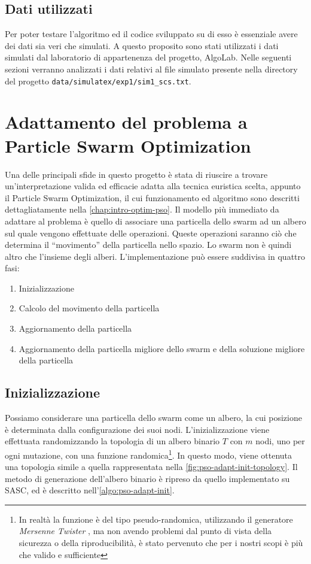 \subsection{Dati utilizzati}
Per poter testare l'algoritmo ed il codice sviluppato su di esso è essenziale avere dei dati sia veri che simulati. A questo proposito sono stati utilizzati i dati simulati dal laboratorio di appartenenza del progetto, AlgoLab. Nelle seguenti sezioni verranno analizzati i dati relativi al file simulato presente nella directory del progetto \texttt{data/simulatex/exp1/sim1\_scs.txt}.

\section{Adattamento del problema a Particle Swarm Optimization}
\label{chap:pso-adapt}
Una delle principali sfide in questo progetto è stata di riuscire a trovare un'interpretazione valida ed efficacie adatta alla tecnica euristica scelta, appunto il Particle Swarm Optimization, il cui funzionamento ed algoritmo sono descritti dettagliatamente nella \autoref{chap:intro-optim-pso}. Il modello più immediato da adattare al problema è quello di associare una particella dello swarm ad un albero sul quale vengono effettuate delle operazioni. Queste operazioni saranno ciò che determina il ``movimento'' della particella nello spazio. Lo swarm non è quindi altro che l'insieme degli alberi. L'implementazione può essere suddivisa in quattro fasi: \begin{enumerate}
  \item Inizializzazione
  \item Calcolo del movimento della particella
  \item Aggiornamento della particella
  \item Aggiornamento della particella migliore dello swarm e della soluzione migliore della particella
\end{enumerate}

\subsection{Inizializzazione}
\label{chap:pso-adapt-init}
Possiamo considerare una particella dello swarm come un albero, la cui posizione è determinata dalla configurazione dei suoi nodi. L'inizializzazione viene effettuata randomizzando la topologia di un albero binario $T$ con $m$ nodi, uno per ogni mutazione, con una funzione randomica\footnote{In realtà la funzione è del tipo pseudo-randomica, utilizzando il generatore \textit{Mersenne Twister} \cite{Matsumoto:MersenneTwister}, ma non avendo problemi dal punto di vista della sicurezza o della riproducibilità, è stato pervenuto che per i nostri scopi è più che valido e sufficiente}. In questo modo, viene ottenuta una topologia simile a quella rappresentata nella \autoref{fig:pso-adapt-init-topology}. Il metodo di generazione dell'albero binario è ripreso da quello implementato su SASC, ed è descritto nell'\autoref{algo:pso-adapt-init}.

